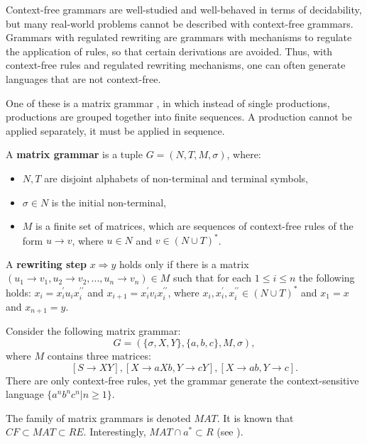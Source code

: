 Context-free grammars are well-studied and well-behaved in terms of decidability, but many real-world problems cannot be described with context-free grammars. Grammars with regulated rewriting are grammars with mechanisms to regulate the application of rules, so that certain derivations are avoided. Thus, with context-free rules and regulated rewriting mechanisms, one can often generate languages that are not context-free.

One of these is a matrix grammar \cite{Dassow12RegulatedRewriting}, in which instead of single productions, productions are grouped together into finite sequences. A production cannot be applied separately, it must be applied in sequence.

\begin{definition}
A {\bf matrix grammar} is a tuple $G = (N,T,M,\sigma)$, where:
\begin{itemize}
  \item $N, T$ are disjoint alphabets of non-terminal and terminal symbols,
  \item $\sigma\in N$ is the initial non-terminal,
  \item $M$ is a finite set of matrices, which are sequences of context-free rules of the form $u\rightarrow v$, where $u\in N$ and $v\in (N\cup T)^*$.
\end{itemize}
\end{definition}

\begin{definition}
A {\bf rewriting step} $x\Rightarrow y$ holds only if there is a matrix $(u_1\rightarrow v_1, u_2\rightarrow v_2, \ldots, u_n\rightarrow v_n) \in M$ such that for each $1\leq i\leq n$ the following holds: $x_i = x_i^{\prime}u_ix_i^{\prime\prime}$ and $x_{i+1} = x_i^{\prime}v_ix_i^{\prime\prime}$, where $x_i, x_i^{\prime}, x_i^{\prime\prime} \in (N\cup T)^*$ and $x_1 = x$ and $x_{n+1} = y$.
\end{definition}

\begin{example}
Consider the following matrix grammar: $$G=(\{\sigma, X,Y\}, \{ a,b,c\}, M, \sigma),$$ where $M$ contains three matrices: $$[S\rightarrow XY], [X\rightarrow aXb, Y\rightarrow cY], [X\rightarrow ab, Y\rightarrow c].$$ There are only context-free rules, yet the grammar generate the context-sensitive language $\{a^nb^nc^n|n\geq 1\}$.
\end{example}

The family of matrix grammars is denoted $MAT$. It is known that $CF \subset MAT \subset RE$. Interestingly, $MAT \cap {a}^* \subset R$ (see \cite{Besozzi:PhD:2004}).
